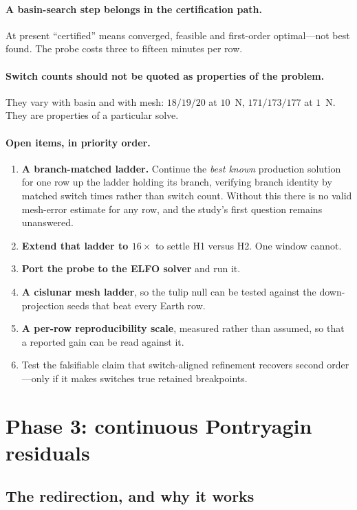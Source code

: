 \documentclass[11pt]{article}
\begin{document}
\paragraph{A basin-search step belongs in the certification path.} At present
``certified'' means converged, feasible and first-order optimal---not best
found. The probe costs three to fifteen minutes per row.

\paragraph{Switch counts should not be quoted as properties of the problem.}
They vary with basin and with mesh: $18/19/20$ at $10$~N, $171/173/177$ at
$1$~N. They are properties of a particular solve.

\paragraph{Open items, in priority order.}
\begin{enumerate}
  \item \textbf{A branch-matched ladder.} Continue the \emph{best known}
  production solution for one row up the ladder holding its branch, verifying
  branch identity by matched switch times rather than switch count. Without
  this there is no valid mesh-error estimate for any row, and the study's
  first question remains unanswered.
  \item \textbf{Extend that ladder to $16\times$} to settle H1 versus H2. One
  window cannot.
  \item \textbf{Port the probe to the ELFO solver} and run it.
  \item \textbf{A cislunar mesh ladder}, so the tulip null can be tested
  against the down-projection seeds that beat every Earth row.
  \item \textbf{A per-row reproducibility scale}, measured rather than
  assumed, so that a reported gain can be read against it.
  \item Test the falsifiable claim that switch-aligned refinement recovers
  second order---only if it makes switches true retained breakpoints.
\end{enumerate}


\section{Phase 3: continuous Pontryagin residuals}
\label{sec:phase3}

\subsection{The redirection, and why it works}
\end{document}

